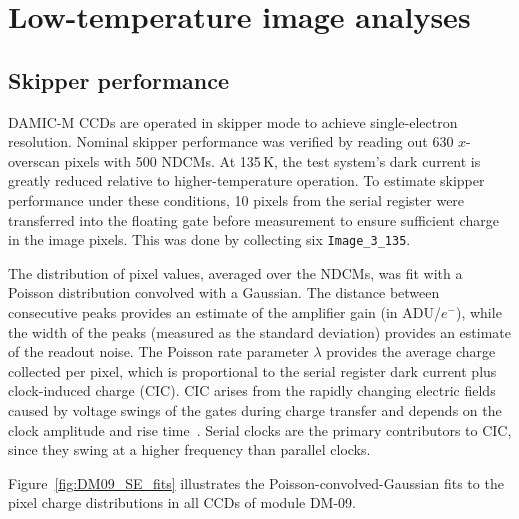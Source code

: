 \documentclass[11pt]{article}
\begin{document}
\section{Low-temperature image analyses}
\label{sec:lowtemp}
\subsection{Skipper performance}
DAMIC-M CCDs are operated in skipper mode to achieve single-electron resolution. Nominal skipper performance was verified by reading out 630 $x$-overscan pixels with 500 NDCMs.
At 135\,K, the test system's dark current is greatly reduced relative to higher-temperature operation. To estimate skipper performance under these conditions, 10 pixels from the serial register were transferred into the floating gate before measurement to ensure sufficient charge in the image pixels. This was done by collecting six \texttt{Image\_3\_135}.

The distribution of pixel values, averaged over the NDCMs, was fit with a Poisson distribution convolved with a Gaussian. The distance between consecutive peaks provides an estimate of the amplifier gain (in ADU/$e^-$), while the width of the peaks (measured as the standard deviation) provides an estimate of the readout noise.
The Poisson rate parameter $\lambda$ provides the average charge collected per pixel, which is proportional to the serial register dark current plus clock-induced charge (CIC). CIC arises from the rapidly changing electric fields caused by voltage swings of the gates during charge transfer and depends on the clock amplitude and rise time~\cite{Oscura:2023qik}. Serial clocks are the primary contributors to CIC, since they swing at a higher frequency than parallel clocks.

Figure~\ref{fig:DM09_SE_fits} illustrates the Poisson-convolved-Gaussian fits to the pixel charge distributions in all CCDs of module DM-09.
\end{document}
